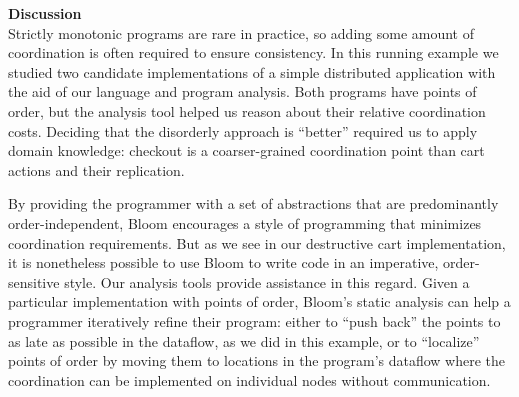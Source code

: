 
\vspace{9pt} \noindent \textbf{Discussion}\\
Strictly monotonic programs
are rare in practice, so adding some amount of coordination is often required to
ensure consistency. In this running example we studied
two candidate implementations of a simple distributed application with the aid of
our language and program analysis. Both programs have points of order, but the analysis tool helped us reason about their relative coordination costs.  Deciding that the disorderly
approach is ``better'' required us to apply domain knowledge: checkout is a coarser-grained coordination point than cart actions and their replication.

By providing the programmer with a set of abstractions that are predominantly
order-independent, Bloom encourages a style of programming that minimizes
coordination requirements. But as we see in our destructive cart implementation,
it is nonetheless possible to use Bloom to write code in an imperative,
order-sensitive style. Our analysis tools provide assistance in this regard.  Given a
particular implementation with points of order, Bloom's static analysis can help
a programmer iteratively refine their program: either to ``push back'' the
points to as late as possible in the dataflow, as we did in this example, or to
``localize'' points of order by moving them to locations in the program's dataflow
where the coordination can be implemented on individual nodes without
communication.
